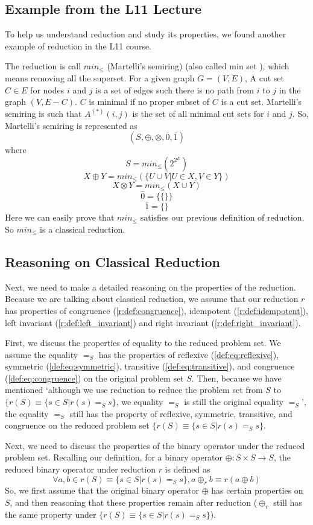 \documentclass[a4paper,12pt,twoside,openright]{report}
\begin{document}
\subsection{Example from the L11 Lecture}
To help us understand reduction and study its properties, we found another example of reduction in the L11 course.

The reduction is call $min_{\leq}$ (Martelli’s semiring)\cite{martelli_gaussian_1976} (also called min set \cite{griffin_2017}), which means removing all the superset. 
For a given graph $G = (V,E)$, A cut set $C \in E$ for nodes $i$ and $j$ is a set of edges such there is no path from $i$ to $j$ in the graph $(V, E - C)$. $C$ is minimal if no proper subset of $C$ is a cut set. Martelli’s semiring is such that $A^{(*)}(i, j)$ is the set of all minimal cut sets for $i$ and $j$. 
So, Martelli’s semiring is represented as \[(S,\oplus,\otimes,\bar0,\bar1)\] where \[S = min_\leq(2^{2^E})\] \[X\oplus Y = min_\leq(\{U \cup V | U \in X, V \in Y\})\] \[X\otimes Y = min_\leq(X \cup Y)\] \[\bar0 = \{\{\}\}\] \[\bar1 = \{\}\]
Here we can easily prove that $min_\leq$ satisfies our previous definition of reduction. So $min_\leq$ is a classical reduction.
\subsection{Reasoning on Classical Reduction}
Next, we need to make a detailed reasoning on the properties of the reduction.
Because we are talking about classical reduction, we assume that our reduction $r$ has properties of congruence (\ref{r:def:congruence}), idempotent (\ref{r:def:idempotent}), left invariant (\ref{r:def:left_invariant}) and right invariant (\ref{r:def:right_invariant}).

First, we discuss the properties of equality to the reduced problem set. We assume the equality $=_S$ has the properties of reflexive (\ref{def:eq:reflexive}), symmetric (\ref{def:eq:symmetric}), transitive (\ref{def:eq:transitive}), and congruence (\ref{def:eq:congruence}) on the original problem set $S$.
Then, because we have mentioned ‘although we use reduction to reduce the problem set from $S$ to $\{r(S) \equiv \{s \in S | r(s) =_S s\} $, we equality $=_S$ is still the original equality $=_S$’, the equality $=_S$ still has the property of reflexive, symmetric, transitive, and congruence on the reduced problem set $\{r(S) \equiv \{s \in S | r(s) =_S s\}$.

Next, we need to discuss the properties of the binary operator under the reduced problem set. 
Recalling our definition, for a binary operator $\oplus : S \times S \rightarrow S$, the reduced binary operator under reduction $r$ is defined as \[\forall a, b \in r(S) \equiv \{s \in S | r(s) =_S s\}, a \oplus_r b \equiv r(a \oplus b)\]
So, we first assume that the original binary operator $\oplus$ has certain properties on $S$, and then reasoning that these properties remain after reduction ($\oplus_r$ still has the same property under $\{r(S) \equiv \{s \in S | r(s) =_S s\}$).
\end{document}
